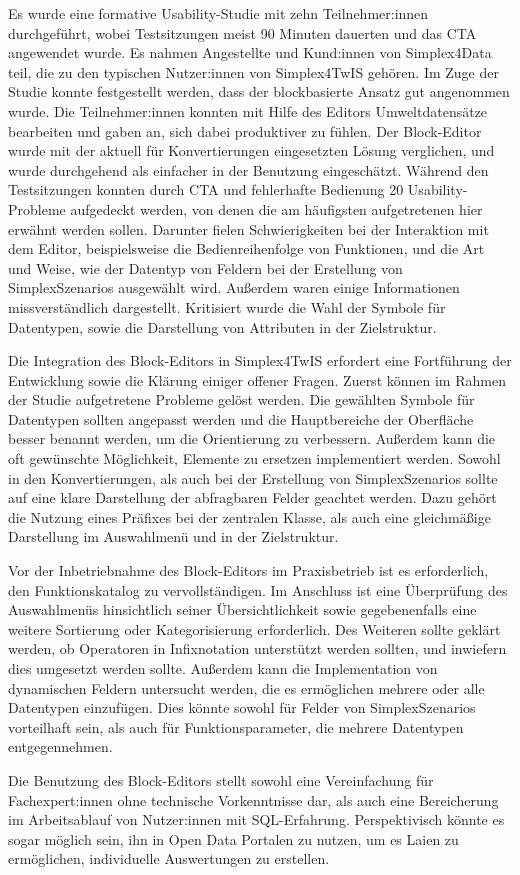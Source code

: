 \pskip
Es wurde eine formative Usability-Studie mit zehn Teilnehmer:innen durchgeführt, wobei Testsitzungen meist 90 Minuten dauerten und das \acf{CTA} angewendet wurde. Es nahmen Angestellte und Kund:innen von Simplex4Data teil, die zu den typischen Nutzer:innen von Simplex4TwIS gehören. Im Zuge der Studie konnte festgestellt werden, dass der blockbasierte Ansatz gut angenommen wurde. Die Teilnehmer:innen konnten mit Hilfe des Editors Umweltdatensätze bearbeiten und gaben an, sich dabei produktiver zu fühlen. Der Block-Editor wurde mit der aktuell für Konvertierungen eingesetzten Lösung verglichen, und wurde durchgehend als einfacher in der Benutzung eingeschätzt. Während den Testsitzungen konnten durch \ac{CTA} und fehlerhafte Bedienung 20 Usability-Probleme aufgedeckt werden, von denen die am häufigsten aufgetretenen hier erwähnt werden sollen. Darunter fielen Schwierigkeiten bei der Interaktion mit dem Editor, beispielsweise die Bedienreihenfolge von Funktionen, und die Art und Weise, wie der Datentyp von Feldern bei der Erstellung von SimplexSzenarios ausgewählt wird. Außerdem waren einige Informationen missverständlich dargestellt. Kritisiert wurde die Wahl der Symbole für Datentypen, sowie die Darstellung von Attributen in der Zielstruktur.

\pskip
Die Integration des Block-Editors in Simplex4TwIS erfordert eine Fortführung der Entwicklung sowie die Klärung einiger offener Fragen. Zuerst können im Rahmen der Studie aufgetretene Probleme gelöst werden. Die gewählten Symbole für Datentypen sollten angepasst werden und die Hauptbereiche der Oberfläche besser benannt werden, um die Orientierung zu verbessern. Außerdem kann die oft gewünschte Möglichkeit, Elemente zu ersetzen implementiert werden. Sowohl in den Konvertierungen, als auch bei der Erstellung von SimplexSzenarios sollte auf eine klare Darstellung der abfragbaren Felder geachtet werden. Dazu gehört die Nutzung eines Präfixes bei der zentralen Klasse, als auch eine gleichmäßige Darstellung im Auswahlmenü und in der Zielstruktur.

Vor der Inbetriebnahme des Block-Editors im Praxisbetrieb ist es erforderlich, den Funktionskatalog zu vervollständigen. Im Anschluss ist eine Überprüfung des Auswahlmenüs hinsichtlich seiner Übersichtlichkeit sowie gegebenenfalls eine weitere Sortierung oder Kategorisierung erforderlich. Des Weiteren sollte geklärt werden, ob Operatoren in Infixnotation unterstützt werden sollten, und inwiefern dies umgesetzt werden sollte. Außerdem kann die Implementation von dynamischen Feldern untersucht werden, die es ermöglichen mehrere oder alle Datentypen einzufügen. Dies könnte sowohl für Felder von SimplexSzenarios vorteilhaft sein, als auch für Funktionsparameter, die mehrere Datentypen entgegennehmen.

\pskip
Die Benutzung des Block-Editors stellt sowohl eine Vereinfachung für Fachexpert:innen ohne technische Vorkenntnisse dar, als auch eine Bereicherung im Arbeitsablauf von Nutzer:innen mit \ac{SQL}-Erfahrung. Perspektivisch könnte es sogar möglich sein, ihn in Open Data Portalen zu nutzen, um es Laien zu ermöglichen, individuelle Auswertungen zu erstellen.
